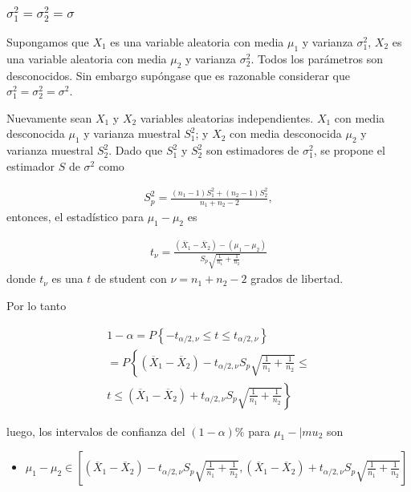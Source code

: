 \begin{itemize}
\begin{enumerate}
\subsubsection*{$\sigma_{1}^{2}=\sigma_{2}^{2}=\sigma$}

Supongamos que $X_{1}$ es una variable aleatoria con media $\mu_{1}$ y varianza $\sigma_{1}^{2}$, $X_{2}$ es una variable aleatoria con media $\mu_{2}$ y varianza $\sigma_{2}^{2}$. Todos los par\'ametros son desconocidos. Sin embargo sup\'ongase que es razonable considerar que $\sigma_{1}^{2}=\sigma_{2}^{2}=\sigma^{2}$.\medskip

Nuevamente sean $X_{1}$ y $X_{2}$ variables aleatorias independientes. $X_{1}$ con media desconocida $\mu_{1}$ y varianza muestral $S_{1}^{2}$; y $X_{2}$ con media desconocida $\mu_{2}$ y varianza muestral $S_{2}^{2}$. Dado que $S_{1}^{2}$ y $S_{2}^{2}$ son estimadores de $\sigma_{1}^{2}$, se propone el estimador $S$ de $\sigma^{2}$ como 

\begin{eqnarray*}
S_{p}^{2}=\frac{\left(n_{1}-1\right)S_{1}^{2}+\left(n_{2}-1\right)S_{2}^{2}}{n_{1}+n_{2}-2},
\end{eqnarray*}
entonces, el estad\'istico para $\mu_{1}-\mu_{2}$ es

\begin{eqnarray*}
t_{\nu}=\frac{\left(\overline{X}_{1}-\overline{X}_{2}\right)-\left(\mu_{1}-\mu_{2}\right)}{S_{p}\sqrt{\frac{1}{n_{1}}+\frac{1}{n_{2}}}}
\end{eqnarray*}
donde $t_{\nu}$ es una $t$ de student con $\nu=n_{1}+n_{2}-2$ grados de libertad.\medskip

Por lo tanto

\begin{eqnarray*}
1-\alpha=P\left\{-t_{\alpha/2,\nu}\leq t\leq t_{\alpha/2,\nu}\right\}\\
=P\left\{\left(\overline{X}_{1}-\overline{X}_{2}\right)-t_{\alpha/2,\nu}S_{p}\sqrt{\frac{1}{n_{1}}+\frac{1}{n_{2}}}\leq \right.\\
\left.t\leq\left(\overline{X}_{1}-\overline{X}_{2}\right)+ t_{\alpha/2,\nu}S_{p}\sqrt{\frac{1}{n_{1}}+\frac{1}{n_{2}}}\right\}
\end{eqnarray*}

luego, los intervalos de confianza del $\left(1-\alpha\right)\%$ para $\mu_{1}-|mu_{2}$ son 
\begin{itemize}
\item $\mu_{1}-\mu_{2}\in\left[\left(\overline{X}_{1}-\overline{X}_{2}\right)- t_{\alpha/2,\nu}S_{p}\sqrt{\frac{1}{n_{1}}+\frac{1}{n_{2}}},\left(\overline{X}_{1}-\overline{X}_{2}\right)+ t_{\alpha/2,\nu}S_{p}\sqrt{\frac{1}{n_{1}}+\frac{1}{n_{2}}}\right]$



\end{itemize}
\end{enumerate}
\end{itemize}
